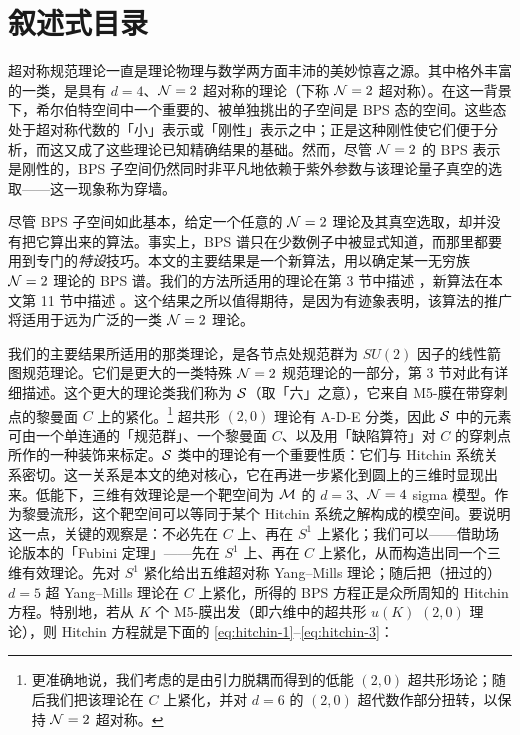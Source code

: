 
\section{叙述式目录}
\label{sec:IntroductionAndSummary}

超对称规范理论一直是理论物理与数学两方面丰沛的美妙惊喜之源。其中格外丰富的一类，是具有 $d=4$、$\mathcal{N}=2$ 超对称的理论（下称 $\mathcal{N}=2$ 超对称）。在这一背景下，希尔伯特空间中一个重要的、被单独挑出的子空间是 BPS 态的空间。这些态处于超对称代数的「小」表示或「刚性」表示之中；正是这种刚性使它们便于分析，而这又成了这些理论已知精确结果的基础。然而，尽管 $\mathcal{N}=2$ 的 BPS 表示是刚性的，BPS 子空间仍然同时非平凡地依赖于紫外参数与该理论量子真空的选取——这一现象称为穿墙。

尽管 BPS 子空间如此基本，给定一个任意的 $\mathcal{N}=2$ 理论及其真空选取，却并没有把它算出来的算法。事实上，BPS 谱只在少数例子中被显式知道，而那里都要用到专门的\emph{特设}技巧。本文的主要结果是一个新算法，用以确定某一无穷族 $\mathcal{N}=2$ 理论的 BPS 谱。我们的方法所适用的理论在第 3 节中描述%
，新算法在本文第 11 节中描述%
。这个结果之所以值得期待，是因为有迹象表明，该算法的推广将适用于远为广泛的一类 $\mathcal{N}=2$ 理论。

我们的主要结果所适用的那类理论，是各节点处规范群为 $SU(2)$ 因子的线性箭图规范理论。它们是更大的一类特殊 $\mathcal{N}=2$ 规范理论的一部分，第 3 节对此有详细描述。这个更大的理论类我们称为 $\mathcal{S}$（取「六」之意），它来自 M5-膜在带穿刺点的黎曼面 $C$ 上的紧化。\footnote{更准确地说，我们考虑的是由引力脱耦而得到的低能 $(2,0)$ 超共形场论；随后我们把该理论在 $C$ 上紧化，并对 $d=6$ 的 $(2,0)$ 超代数作部分扭转，以保持 $\mathcal{N}=2$ 超对称。} 超共形 $(2,0)$ 理论有 A-D-E 分类，因此 $\mathcal{S}$ 中的元素可由一个单连通的「规范群」、一个黎曼面 $C$、以及用「缺陷算符」对 $C$ 的穿刺点所作的一种装饰来标定。$\mathcal{S}$ 类中的理论有一个重要性质：它们与 Hitchin 系统关系密切。这一关系是本文的绝对核心，它在再进一步紧化到圆上的三维时显现出来。低能下，三维有效理论是一个靶空间为 $\mathcal{M}$ 的 $d=3$、$\mathcal{N}=4$ sigma 模型。作为黎曼流形，这个靶空间可以等同于某个 Hitchin 系统之解构成的模空间。要说明这一点，关键的观察是：不必先在 $C$ 上、再在 $S^1$ 上紧化；我们可以——借助场论版本的「Fubini 定理」——先在 $S^1$ 上、再在 $C$ 上紧化，从而构造出同一个三维有效理论。先对 $S^1$ 紧化给出五维超对称 Yang–Mills 理论；随后把（扭过的）$d=5$ 超 Yang–Mills 理论在 $C$ 上紧化，所得的 BPS 方程正是众所周知的 Hitchin 方程。特别地，若从 $K$ 个 M5-膜出发（即六维中的超共形 $u(K)$ $(2,0)$ 理论），则 Hitchin 方程就是下面的 \eqref{eq:hitchin-1}–\eqref{eq:hitchin-3}：

